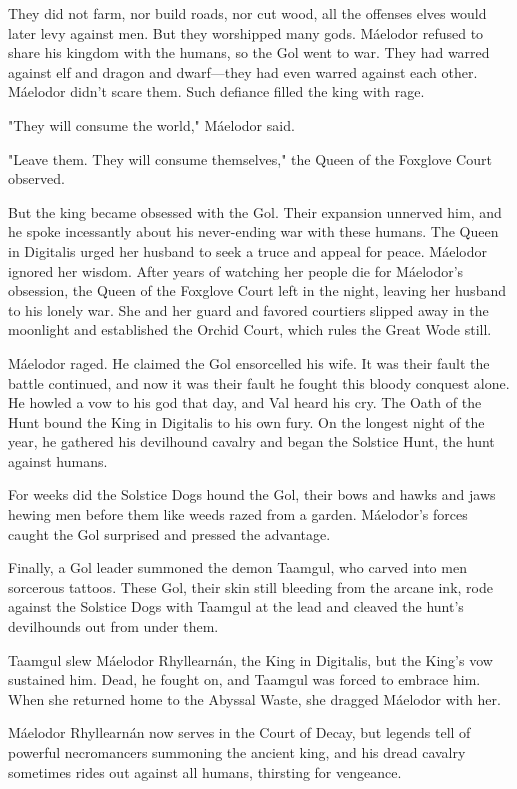 \documentclass[10pt,a4paper,twoside,bg=print,twocolumn,openany,nodeprecatedcode]{dndbook}
\begin{document}
They did not farm, nor build roads, nor cut wood, all the offenses elves would later levy against men. But they worshipped many gods. Máelodor refused to share his kingdom with the humans, so the Gol went to war. They had warred against elf and dragon and dwarf—they had even warred against each other. Máelodor didn't scare them. Such defiance filled the king with rage.

"They will consume the world," Máelodor said.

"Leave them. They will consume themselves," the Queen of the Foxglove Court observed.

But the king became obsessed with the Gol. Their expansion unnerved him, and he spoke incessantly about his never-ending war with these humans. The Queen in Digitalis urged her husband to seek a truce and appeal for peace. Máelodor ignored her wisdom. After years of watching her people die for Máelodor's obsession, the Queen of the Foxglove Court left in the night, leaving her husband to his lonely war. She and her guard and favored courtiers slipped away in the moonlight and established the Orchid Court, which rules the Great Wode still.

Máelodor raged. He claimed the Gol ensorcelled his wife. It was their fault the battle continued, and now it was their fault he fought this bloody conquest alone. He howled a vow to his god that day, and Val heard his cry. The Oath of the Hunt bound the King in Digitalis to his own fury. On the longest night of the year, he gathered his devilhound cavalry and began the Solstice Hunt, the hunt against humans.

For weeks did the Solstice Dogs hound the Gol, their bows and hawks and jaws hewing men before them like weeds razed from a garden. Máelodor's forces caught the Gol surprised and pressed the advantage.

Finally, a Gol leader summoned the demon Taamgul, who carved into men sorcerous tattoos. These Gol, their skin still bleeding from the arcane ink, rode against the Solstice Dogs with Taamgul at the lead and cleaved the hunt's devilhounds out from under them.

Taamgul slew Máelodor Rhyllearnán, the King in Digitalis, but the King's vow sustained him. Dead, he fought on, and Taamgul was forced to embrace him. When she returned home to the Abyssal Waste, she dragged Máelodor with her.

Máelodor Rhyllearnán now serves in the Court of Decay, but legends tell of powerful necromancers summoning the ancient king, and his dread cavalry sometimes rides out against all humans, thirsting for vengeance.
\end{document}
